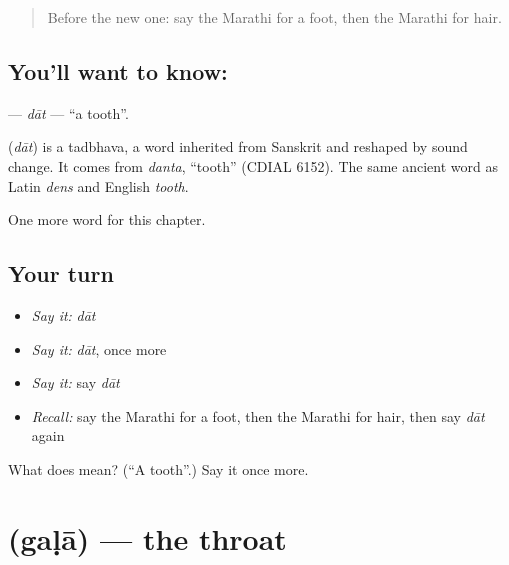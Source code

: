\label{lesson:MR-C70-dat}



\begin{quote}
Before the new one: say the Marathi for a foot, then the Marathi for hair.
\end{quote}

\subsection*{You'll want to know: }
\textbf{} — \emph{dāt} — \textquotedblleft{}a tooth\textquotedblright{}.

\begin{cousinweb}
\textbf{} (\emph{dāt}) is a tadbhava, a word inherited from Sanskrit and reshaped by sound change. It comes from \emph{danta}, \textquotedblleft{}tooth\textquotedblright{} (CDIAL 6152). The same ancient word as Latin \emph{dens} and English \emph{tooth}.
\end{cousinweb}

\begin{grammarlens}[title={What you've built}]
One more word for this chapter.
\end{grammarlens}

\subsection*{Your turn}
\begin{itemize}
\raggedright
  \item \emph{Say it:} \emph{dāt}
  \item \emph{Say it:} \emph{dāt}, once more
  \item \emph{Say it:} say \emph{dāt}
  \item \emph{Recall:} say the Marathi for a foot, then the Marathi for hair, then say \emph{dāt} again
\end{itemize}

\begin{tcolorbox}[breakable,colback=teal!4,colframe=teal!35!black,title={Before you move on}]
What does  mean? (\textquotedblleft{}A tooth\textquotedblright{}.) Say it once more.
\end{tcolorbox}
\section[\texorpdfstring{\mr{गळा} (gaḷā)}{गळा (gaḷā)}]{ (gaḷā) — the throat}

\label{lesson:MR-C70-gala}



